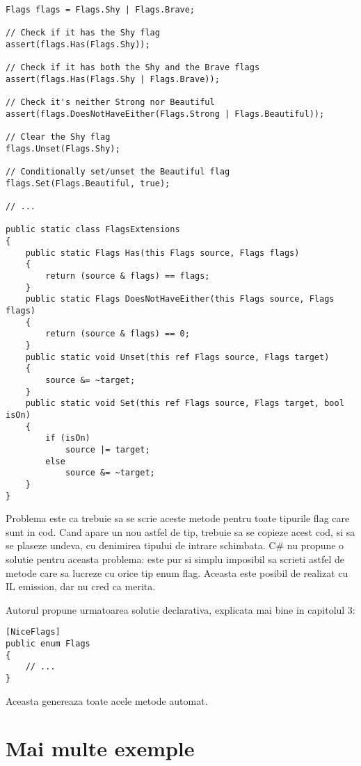 \documentclass{report}
\begin{document}
\begin{lstlisting}
Flags flags = Flags.Shy | Flags.Brave;

// Check if it has the Shy flag
assert(flags.Has(Flags.Shy));

// Check if it has both the Shy and the Brave flags
assert(flags.Has(Flags.Shy | Flags.Brave));

// Check it's neither Strong nor Beautiful
assert(flags.DoesNotHaveEither(Flags.Strong | Flags.Beautiful));

// Clear the Shy flag
flags.Unset(Flags.Shy);

// Conditionally set/unset the Beautiful flag
flags.Set(Flags.Beautiful, true);

// ...

public static class FlagsExtensions
{
    public static Flags Has(this Flags source, Flags flags)
    {
        return (source & flags) == flags;
    }
    public static Flags DoesNotHaveEither(this Flags source, Flags flags)
    {
        return (source & flags) == 0;
    }
    public static void Unset(this ref Flags source, Flags target)
    {
        source &= ~target;
    }
    public static void Set(this ref Flags source, Flags target, bool isOn)
    {
        if (isOn)
            source |= target;
        else
            source &= ~target;
    }
}
\end{lstlisting}

Problema este ca trebuie sa se scrie aceste metode pentru toate tipurile
flag care sunt in cod. Cand apare un nou astfel de tip, trebuie sa se
copieze acest cod, si sa se plaseze undeva, cu denimirea tipului de
intrare schimbata. C\# nu propune o solutie pentru aceasta problema:
este pur si simplu imposibil sa scrieti astfel de metode care sa lucreze
cu orice tip enum flag. Aceasta este posibil de realizat cu IL emission,
dar nu cred ca merita.

Autorul propune urmatoarea solutie declarativa, explicata mai bine in
capitolul 3:

\begin{lstlisting}
[NiceFlags]
public enum Flags
{
    // ...
}
\end{lstlisting}

Aceasta genereaza toate acele metode automat.

\section{Mai multe exemple}
\end{document}
